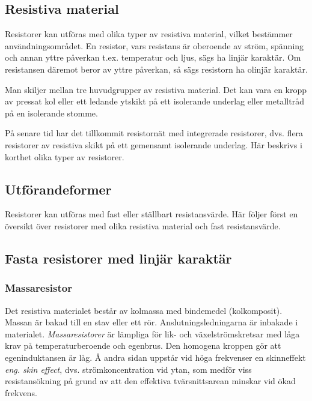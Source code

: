 \subsection{Resistiva material}

Resistorer kan utföras med olika typer av resistiva material, vilket bestämmer
användningsområdet. En resistor, vars resistans är oberoende av ström, spänning
och annan yttre påverkan t.ex. temperatur och ljus, sägs ha linjär karaktär.
Om resistansen däremot beror av yttre påverkan, så sägs resistorn ha olinjär
karaktär. 

Man skiljer mellan tre huvudgrupper av resistiva material. Det kan
vara en kropp av pressat kol eller ett ledande ytskikt på ett isolerande
underlag eller metalltråd på en isolerande stomme. 

På senare tid har det
tillkommit resistornät med integrerade resistorer, dvs. flera resistorer av
resistiva skikt på ett gemensamt isolerande underlag. Här beskrivs i korthet
olika typer av resistorer.

\subsection{Utförandeformer}

Resistorer kan utföras med fast eller ställbart resistansvärde. Här följer
först en översikt över resistorer med olika resistiva material och fast
resistansvärde.

\subsection{Fasta resistorer med linjär karaktär}

\subsubsection{Massaresistor}

Det resistiva materialet består av kolmassa med bindemedel (kolkomposit).
Massan är bakad till en stav eller ett rör. Anslutningsledningarna är inbakade
i materialet.
\emph{Massaresistorer} är lämpliga för lik- och växelströmskretsar med
låga krav på temperaturberoende och egenbrus. Den homogena kroppen gör att
egeninduktansen är låg. Å andra sidan uppstår vid höga frekvenser en
skinneffekt \emph{eng. skin effect}, dvs. strömkoncentration vid ytan, som medför viss resistansökning på grund av att den effektiva tvärsnittsarean minskar vid ökad frekvens.

